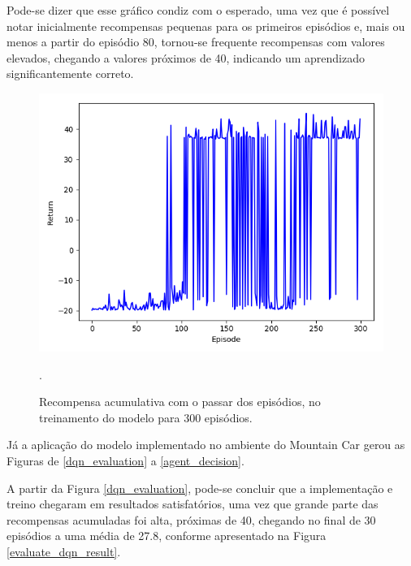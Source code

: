 \documentclass[conference]{IEEEtran}
\begin{document}
	Pode-se dizer que esse gráfico condiz com o esperado, uma vez que é possível notar inicialmente recompensas pequenas para os primeiros episódios e, mais ou menos a partir do episódio 80, tornou-se frequente recompensas com valores elevados, chegando a valores próximos de 40, indicando um aprendizado significantemente correto.

\begin{figure}[htbp]
\centering
\centerline{\includegraphics[scale=0.3]{imagens/train/15.png}}
\caption{Recompensa acumulativa com o passar dos episódios, no treinamento do modelo para 300 episódios.}.
\label{train/15}
\end{figure} 

	Já a aplicação do modelo implementado no ambiente do Mountain Car gerou as Figuras de \ref{dqn_evaluation} a \ref{agent_decision}.
	
	A partir da Figura \ref{dqn_evaluation}, pode-se concluir que a implementação e treino chegaram em resultados satisfatórios, uma vez que grande parte das recompensas acumuladas foi alta, próximas de 40, chegando no final de 30 episódios a uma média de 27.8, conforme apresentado na Figura \ref{evaluate_dqn_result}.
	
\end{document}
